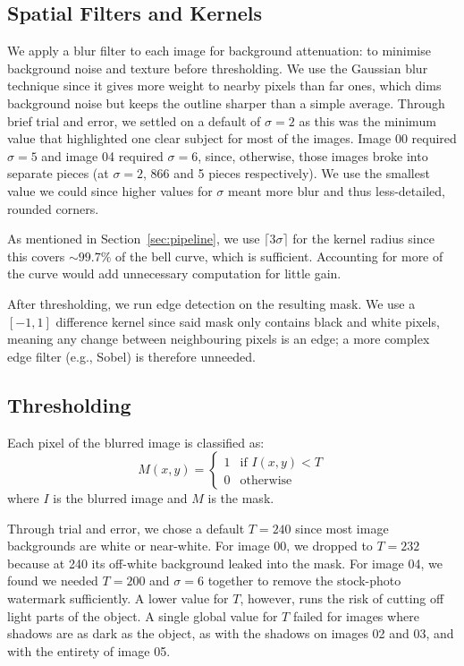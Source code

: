 \documentclass[conference]{IEEEtran}
\begin{document}
\subsection{Spatial Filters and Kernels}
We apply a blur filter to each image for background attenuation: to minimise background noise and texture before thresholding.
We use the Gaussian blur technique since it gives more weight to nearby pixels than far ones, which dims background noise but keeps the outline sharper than a simple average.
Through brief trial and error, we settled on a default of $\sigma=2$ as this was the minimum value that highlighted one clear subject for most of the images.
Image 00 required $\sigma=5$ and image 04 required $\sigma=6$, since, otherwise, those images broke into separate pieces (at $\sigma=2$, 866 and 5 pieces respectively).
We use the smallest value we could since higher values for $\sigma$ meant more blur and thus less-detailed, rounded corners.

As mentioned in Section~\ref{sec:pipeline}, we use $\lceil3\sigma\rceil$ for the kernel radius since this covers $\sim99.7\%$ of the bell curve, which is sufficient.
Accounting for more of the curve would add unnecessary computation for little gain.

After thresholding, we run edge detection on the resulting mask.
We use a $[-1, 1]$ difference kernel since said mask only contains black and white pixels, meaning any change between neighbouring pixels is an edge; a more complex edge filter (e.g., Sobel) is therefore unneeded.

\subsection{Thresholding}

Each pixel of the blurred image is classified as:
\begin{equation}
  M(x,y) =
  \begin{cases} 1 & \text{if } I(x,y) < T \\ 0 & \text{otherwise}
  \end{cases}
\end{equation}
where $I$ is the blurred image and $M$ is the mask.

Through trial and error, we chose a default $T=240$ since most image backgrounds are white or near-white.
For image 00, we dropped to $T=232$ because at 240 its off-white background leaked into the mask.
For image 04, we found we needed $T=200$ and $\sigma=6$ together to remove the stock-photo watermark sufficiently.
A lower value for $T$, however, runs the risk of cutting off light parts of the object.
A single global value for $T$ failed for images where shadows are as dark as the object, as with the shadows on images 02 and 03, and with the entirety of image 05.
\end{document}
